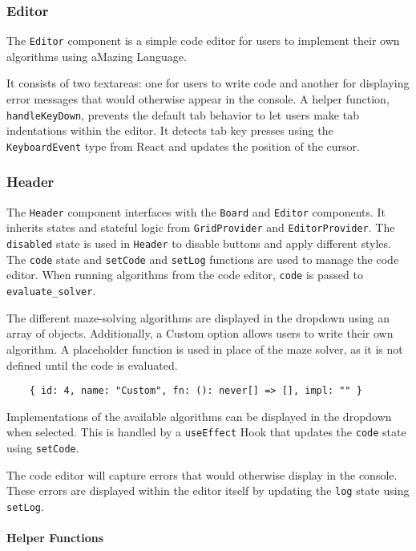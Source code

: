\subsubsection{Editor}
The \texttt{Editor} component is a simple code editor for users to implement their own algorithms using aMazing Language.

It consists of two textareas: one for users to write code and another for displaying error messages that would otherwise appear in the console. A helper function, \texttt{handleKeyDown}, prevents the default tab behavior to let users make tab indentations within the editor. It detects tab key presses using the \texttt{KeyboardEvent} type from React and updates the position of the cursor.

\subsubsection{Header}
The \texttt{Header} component interfaces with the \texttt{Board} and \texttt{Editor} components. It inherits states and stateful logic from \texttt{GridProvider} and \texttt{EditorProvider}. The \texttt{disabled} state is used in \texttt{Header} to disable buttons and apply different styles. The \texttt{code} state and \texttt{setCode} and \texttt{setLog} functions are used to manage the code editor. When running algorithms from the code editor, \texttt{code} is passed to \texttt{evaluate\_solver}.

The different maze-solving algorithms are displayed in the dropdown using an array of objects. Additionally, a Custom option allows users to write their own algorithm. A placeholder function is used in place of the maze solver, as it is not defined until the code is evaluated.

\begin{verbatim}
    { id: 4, name: "Custom", fn: (): never[] => [], impl: "" }
\end{verbatim}

Implementations of the available algorithms can be displayed in the dropdown when selected. This is handled by a \texttt{useEffect} Hook that updates the \texttt{code} state using \texttt{setCode}.

The code editor will capture errors that would otherwise display in the console. These errors are displayed within the editor itself by updating the \texttt{log} state using \texttt{setLog}.

\paragraph{Helper Functions} \

